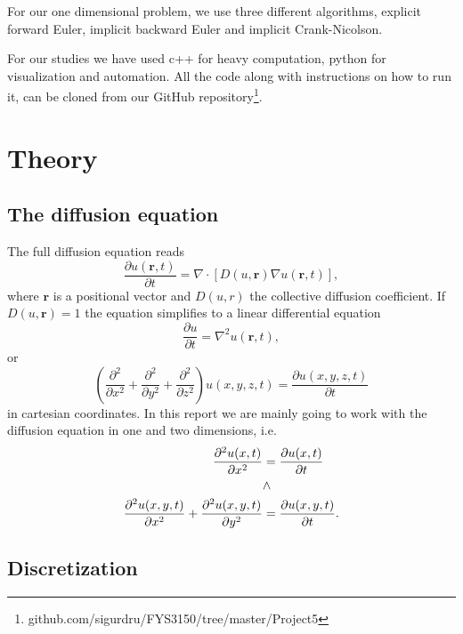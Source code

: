 \documentclass[reprint, english,notitlepage,nofootinbib]{revtex4-1}  %
\begin{document}
For our one dimensional problem, we use three different algorithms, explicit forward Euler, implicit backward Euler and implicit Crank-Nicolson.

For our studies we have used c++ for heavy computation, python for visualization and automation. All the code along with instructions on how to run it, can be cloned from our GitHub repository\footnote{github.com/sigurdru/FYS3150/tree/master/Project5}.

\section{Theory}

\subsection*{The diffusion equation}

The full diffusion equation reads
\begin{equation*}
	\frac{\partial u(\mathbf{r}, t)}{\partial t} = \nabla \cdot \left[D(u, \mathbf{r})\nabla u(\mathbf{r}, t)\right],
\end{equation*}
where $\mathbf{r}$ is a positional vector and $D(u,r)$ the collective diffusion coefficient. If $D(u,\mathbf{r}) = 1$ the equation simplifies to a linear differential equation
\begin{equation*}
	\frac{\partial u}{\partial t} = \nabla^2u(\mathbf{r}, t),
\end{equation*}
or
\begin{equation}
	\label{eq:diffusion_equation}
	\left(\frac{\partial^2}{\partial x^2} + \frac{\partial^2}{\partial y^2} + \frac{\partial^2}{\partial z^2}\right) u(x,y,z,t) = \frac{\partial u(x,y,z,t)}{\partial t}
\end{equation}
in cartesian coordinates. In this report we are mainly going to work with the diffusion equation in one and two dimensions, i.e.
\begin{align*}
	 \scriptsize\frac{\partial^2 u(x,t)}{\partial x^2} &= \frac{\partial u(x,t)}{\partial t} \\ &\wedge \\ \frac{\partial^2u(x, y,t)}{\partial x^2} + \frac{\partial^2u(x, y,t)}{\partial y^2} &= \frac{\partial u(x, y,t)}{\partial t}.
\end{align*}

\subsection*{Discretization}
\end{document}
